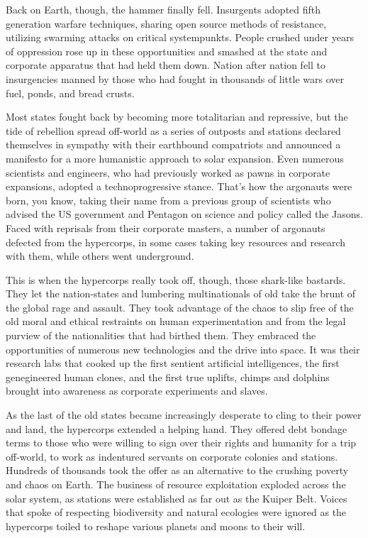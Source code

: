 Back on Earth, though, the hammer finally fell. Insurgents adopted fifth generation warfare techniques, 
sharing open source methods of resistance, utilizing 
swarming attacks on critical systempunkts. People 
crushed under years of oppression rose up in these 
opportunities and smashed at the state and corporate 
apparatus that had held them down. Nation after 
nation fell to insurgencies manned by those who had 
fought in thousands of little wars over fuel, ponds, 
and bread crusts.

Most states fought back by becoming more totalitarian and repressive, but the tide of rebellion spread 
off-world as a series of outposts and stations declared 
themselves in sympathy with their earthbound compatriots and announced a manifesto for a more humanistic approach to solar expansion. Even numerous 
scientists and engineers, who had previously worked 
as pawns in corporate expansions, adopted a technoprogressive stance. That's how the argonauts were 
born, you know, taking their name from a previous 
group of scientists who advised the US government 
and Pentagon on science and policy called the Jasons. 
Faced with reprisals from their corporate masters, a 
number of argonauts defected from the hypercorps, 
in some cases taking key resources and research with 
them, while others went underground.

This is when the hypercorps really took off, though, 
those shark-like bastards. They let the nation-states 
and lumbering multinationals of old take the brunt 
of the global rage and assault. They took advantage 
of the chaos to slip free of the old moral and ethical 
restraints on human experimentation and from the 
legal purview of the nationalities that had birthed 
them. They embraced the opportunities of numerous 
new technologies and the drive into space. It was their 
research labs that cooked up the first sentient artificial 
intelligences, the first genegineered human clones, and 
the first true uplifts, chimps and dolphins brought 
into awareness as corporate experiments and slaves.

As the last of the old states became increasingly 
desperate to cling to their power and land, the hypercorps extended a helping hand. They offered debt 
bondage terms to those who were willing to sign over 
their rights and humanity for a trip off-world, to work 
as indentured servants on corporate colonies and stations. Hundreds of thousands took the offer as an alternative to the crushing poverty and chaos on Earth. 
The business of resource exploitation exploded across 
the solar system, as stations were established as far 
out as the Kuiper Belt. Voices that spoke of respecting 
biodiversity and natural ecologies were ignored as 
the hypercorps toiled to reshape various planets and 
moons to their will.

